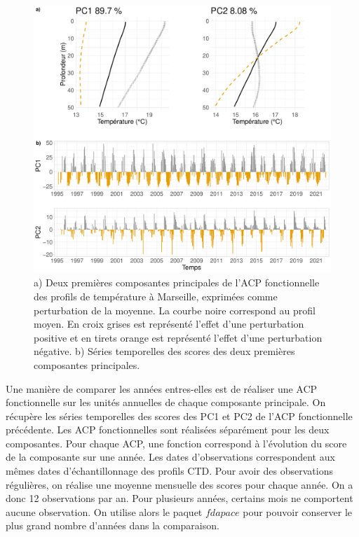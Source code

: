 \documentclass[12pt]{article}
\begin{document}
\begin{figure}
\centering
\includegraphics[width=.9\textwidth]{fig/R132_mean_pert_CTD.pdf}
\caption{a) Deux premières composantes principales de l'ACP fonctionnelle des profils de température à Marseille, exprimées comme perturbation de la moyenne. La courbe noire correspond au profil moyen. En croix grises est représenté l’effet d’une perturbation positive et en tirets orange est représenté l’effet d’une perturbation négative. b) Séries temporelles des scores des deux premières composantes principales.
}
\label{acp_ctd}
\end{figure}

Une manière de comparer les années entres-elles est de réaliser une ACP fonctionnelle sur les unités annuelles de chaque composante principale. On récupère les séries temporelles des scores des PC1 et PC2 de l’ACP fonctionnelle précédente. Les ACP fonctionnelles sont réalisées séparément pour les deux composantes. Pour chaque ACP, une fonction correspond à l’évolution du score de la composante sur une année. Les dates d’observations correspondent aux mêmes dates d’échantillonnage des profils CTD. Pour avoir des observations régulières, on réalise une moyenne mensuelle des scores pour chaque année. On a donc 12 observations par an. Pour plusieurs années, certains mois ne comportent aucune observation. On utilise alors le paquet $fdapace$ pour pouvoir conserver le plus grand nombre d’années dans la comparaison. 
\end{document}
